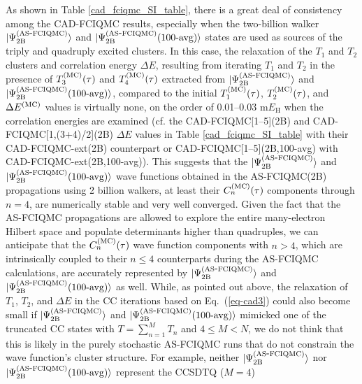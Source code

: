 \documentclass[journal=jcp,manuscript=suppinfo]{achemso}
\begin{document}
As shown in Table \ref{cad_fciqmc_SI_table}, there is a great deal of consistency among the CAD-FCIQMC
results, especially when the two-billion walker $|\Psi_{\rm 2B}^{\rm (AS\mbox{-}FCIQMC)}\rangle$ and
$|\Psi_{\rm 2B}^{\rm (AS\mbox{-}FCIQMC)}\mbox{(100-avg)}\rangle$ states are used as sources of
the triply and quadruply excited clusters. In this case, the relaxation of the $T_{1}$ and $T_{2}$
clusters and correlation energy $\Delta E$, resulting from iterating $T_{1}$ and $T_{2}$ in
the presence of $T_{3}^{\rm (MC)}(\tau)$ and $T_{4}^{\rm (MC)}(\tau)$ extracted from
$|\Psi_{\rm 2B}^{\rm (AS\mbox{-}FCIQMC)}\rangle$ and
$|\Psi_{\rm 2B}^{\rm (AS\mbox{-}FCIQMC)}\mbox{(100-avg)}\rangle$,
compared to the initial $T_{1}^{\rm (MC)}(\tau)$, $T_{2}^{\rm (MC)}(\tau)$, and $\Delta E^{\rm (MC)}$
values is virtually none, on the order of 0.01--0.03 $\text{m}E_{\text{H}}$ when the correlation
energies are examined (cf. the CAD-FCIQMC[1--5](2B) and CAD-FCIQMC[1,(3+4)/2](2B)
$\Delta E$ values in Table \ref{cad_fciqmc_SI_table} with their CAD-FCIQMC-ext(2B) counterpart
or CAD-FCIQMC[1--5](2B,100-avg) with CAD-FCIQMC-ext(2B,100-avg)). This suggests that the
$|\Psi_{\rm 2B}^{\rm (AS\mbox{-}FCIQMC)}\rangle$ and $|\Psi_{\rm 2B}^{\rm (AS\mbox{-}FCIQMC)}\mbox{(100-avg)}\rangle$
wave functions obtained in the AS-FCIQMC(2B) propagations using 2 billion walkers, at least their
$C_{n}^{\rm (MC)}(\tau)$ components through $n = 4$, are numerically stable and very well converged.
Given the fact that the AS-FCIQMC propagations are allowed to explore the entire many-electron Hilbert
space and populate determinants higher than quadruples, we can anticipate that the $C_{n}^{\rm (MC)}(\tau)$
wave function components with $n > 4$, which are intrinsically coupled to their $n \leq 4$ counterparts during
the AS-FCIQMC calculations, are accurately represented by $|\Psi_{\rm 2B}^{\rm (AS\mbox{-}FCIQMC)}\rangle$
and $|\Psi_{\rm 2B}^{\rm (AS\mbox{-}FCIQMC)}\mbox{(100-avg)}\rangle$ as well. While, as pointed out above,
the relaxation of $T_{1}$, $T_{2}$, and $\Delta E$ in the CC iterations based on Eq.\ (\ref{eq-cad3}) could
also become small if $|\Psi_{\rm 2B}^{\rm (AS\mbox{-}FCIQMC)}\rangle$ and
$|\Psi_{\rm 2B}^{\rm (AS\mbox{-}FCIQMC)}\mbox{(100-avg)}\rangle$ mimicked one of the truncated CC
states with $T = \sum_{n=1}^{M} T_{n}$ and $4 \leq M < N$, we do not think that this is likely
in the purely stochastic AS-FCIQMC runs that do not constrain the wave function's cluster structure.
For example, neither $|\Psi_{\rm 2B}^{\rm (AS\mbox{-}FCIQMC)}\rangle$ nor
$|\Psi_{\rm 2B}^{\rm (AS\mbox{-}FCIQMC)}\mbox{(100-avg)}\rangle$ represent the CCSDTQ ($M=4$)
\end{document}
